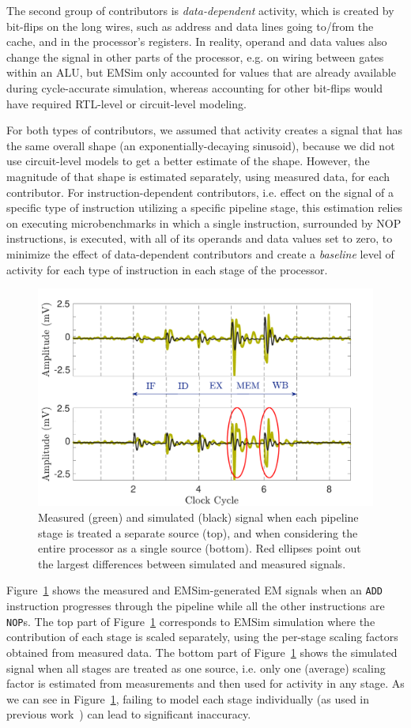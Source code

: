 The second group of contributors is \textit{data-dependent} activity, which is created by bit-flips on the long wires, such as address and data lines going to/from the cache, and in the processor's registers. In reality, operand and data values also change the signal in other parts of the processor, e.g. on wiring between gates within an ALU, but EMSim only accounted for values that are already available during cycle-accurate simulation, whereas accounting for other bit-flips would have required RTL-level or circuit-level modeling.

For both types of contributors, we assumed that activity creates a signal that has the same overall shape (an exponentially-decaying sinusoid), because we did not use circuit-level models to get a better estimate of the shape. However, the magnitude of that shape is estimated separately, using measured data, for each contributor. For instruction-dependent contributors, i.e. effect on the signal of a specific type of instruction utilizing a specific pipeline stage, this estimation relies on executing microbenchmarks in which a single instruction, surrounded by NOP instructions, is executed, with all of its operands and data values set to zero,
to minimize the effect of data-dependent contributors and create a \emph{baseline} level of activity for each type of instruction in each stage of the processor.

\begin{figure}
	\centering
\vspace{-0.2in}
	\includegraphics[width=0.45\columnwidth,clip]{figure/amp2.pdf}
\vspace{-0.3in}
	\caption{Measured (green) and simulated (black) signal when each pipeline stage is treated a separate source (top), and when considering the entire processor as a single source (bottom). Red ellipses point out the largest differences between simulated and measured signals.}
	\label{fig:amp}
\end{figure}
Figure~\ref{fig:amp} shows the measured and EMSim-generated EM signals when an {\tt ADD} instruction progresses through the pipeline while all the other instructions are {\tt NOP}s. The top part of Figure~\ref{fig:amp} corresponds to EMSim simulation where the contribution of each stage is scaled separately, using the per-stage scaling factors obtained from measured data. The bottom part of Figure~\ref{fig:amp} shows the simulated signal when all stages are treated as one source, i.e. only one (average) scaling factor is estimated from measurements and then used for activity in any stage. As we can see in Figure~\ref{fig:amp}, failing to model each stage individually (as used in previous work~\cite{McCann:2017:TPT:3241189.3241207}) can lead to significant inaccuracy.

